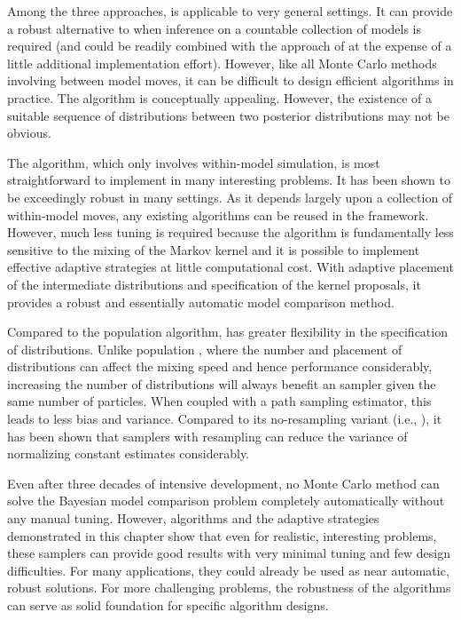 Among the three approaches, \smc[1] is applicable to very general settings. It
can provide a robust alternative to \rjmcmc when inference on a countable
collection of models is required (and could be readily combined with the
approach of \cite{Jasra:2008bb} at the expense of a little additional
implementation effort). However, like all Monte Carlo methods involving
between model moves, it can be difficult to design efficient algorithms in
practice. The \smc[3] algorithm is conceptually appealing. However, the
existence of a suitable sequence of distributions between two posterior
distributions may not be obvious.

The \smc[2] algorithm, which only involves within-model simulation, is most
straightforward to implement in many interesting problems. It has been shown
to be exceedingly robust in many settings. As it depends largely upon a
collection of within-model \mcmc moves, any existing \mcmc algorithms can be
reused in the \smc[2] framework. However, much less tuning is required because
the algorithm is fundamentally less sensitive to the mixing of the Markov
kernel and it is possible to implement effective adaptive strategies at little
computational cost. With adaptive placement of the intermediate distributions
and specification of the \mcmc kernel proposals, it provides a robust and
essentially automatic model comparison method.

Compared to the population \mcmc algorithm, \smc[2] has greater flexibility in
the specification of distributions. Unlike population \mcmc, where the number
and placement of distributions can affect the mixing speed and hence
performance considerably, increasing the number of distributions will always
benefit an \smc sampler given the same number of particles. When coupled with a
path sampling estimator, this leads to less bias and variance. Compared to its
no-resampling variant (i.e., \aic), it has been shown that \smc samplers with
resampling can reduce the variance of normalizing constant estimates
considerably.

Even after three decades of intensive development, no Monte Carlo method can
solve the Bayesian model comparison problem completely automatically without
any manual tuning. However, \smc algorithms and the adaptive strategies
demonstrated in this chapter show that even for realistic, interesting problems,
these samplers can provide good results with very minimal tuning and few
design difficulties. For many applications, they could already be used as near
automatic, robust solutions. For more challenging problems, the robustness of
the algorithms can serve as solid foundation for specific algorithm designs.
